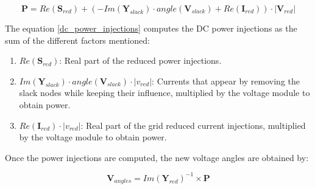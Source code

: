 \documentclass[nols,a4paper,twoside,notoc,fleqn]{tufte-book}
\begin{document}
%
%
%
%
%
%
%
%
%

\begin{equation}
\textbf{P} = Re(\textbf{S}_{red}) + (- Im(\textbf{Y}_{slack}) \cdot angle(\textbf{V}_{slack}) + Re(\textbf{I}_{red})) \cdot |\textbf{V}_{red}|
\label{dc_power_injections}
\end{equation}

The equation \ref{dc_power_injections} computes the DC power injections as the sum of the different factors mentioned:

\begin{enumerate}
	\item $Re(\textbf{S}_{red})$: Real part of the reduced power injections.
	\item $Im(\textbf{Y}_{slack}) \cdot angle(\textbf{V}_{slack}) \cdot |v_{red}|$: Currents that appear by removing the slack nodes while keeping their influence, multiplied by the voltage module to obtain power.
	\item $Re(\textbf{I}_{red}) \cdot |v_{red}|$: Real part of the grid reduced current injections, multiplied by the voltage module to obtain power.
\end{enumerate}

Once the power injections are computed, the new voltage angles are obtained by:

\begin{equation}
\textbf{V}_{angles} = Im(\textbf{Y}_{red})^{-1} \times \textbf{P}
\end{equation}
\end{document}

